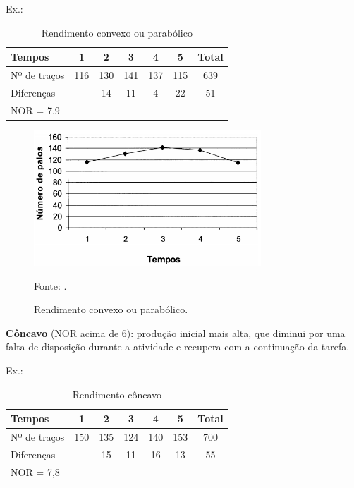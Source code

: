 Ex.:
\begin{table}[h]
\centering
\caption{Rendimento convexo ou parabólico \cite{psicohood2018} }
\label{tab:convexo} 

\begin{tabular}{|l|c|c|c|c|c|c|}
\hline Tempos       & 1     & 2     & 3    &  4     & 5     & Total \\ 
\hline Nº de traços & 116 & 130 & 141 & 137 & 115 & 639 \\ 
\hline    \multicolumn{2}{|l|}{ Diferenças}& 14   & 11    &4     & 22    & 51\\ 
\hline NOR = 7,9\\
\cline{1-11}
\end{tabular} 

\end{table}

\begin{figure}[H]
 \centering
 \includegraphics[width=0.76\textwidth]{./fig/grafico-rendimento/convexo}
 \caption{Rendimento convexo ou parabólico.}
  Fonte: \cite{psicohood2018}.
 \label{fig:convexo}
\end{figure}

\textbf{Côncavo} (NOR acima de 6): produção inicial mais alta, que diminui por uma falta de disposição durante a atividade
e recupera com a continuação da tarefa.

Ex.:
\begin{table}[h]
\centering
\caption{Rendimento côncavo\cite{psicohood2018} }
\label{tab:côncavo} 
\begin{tabular}{|l|c|c|c|c|c|c|}
\hline Tempos       & 1     & 2     & 3    &  4     & 5     & Total \\ 
\hline Nº de traços & 150 & 135 & 124 & 140 & 153 & 700 \\ 
\hline    \multicolumn{2}{|l|}{ Diferenças}& 15   & 11    &16     & 13    & 55\\ 
\hline NOR = 7,8\\
\cline{1-11}
\end{tabular} 

\end{table}

